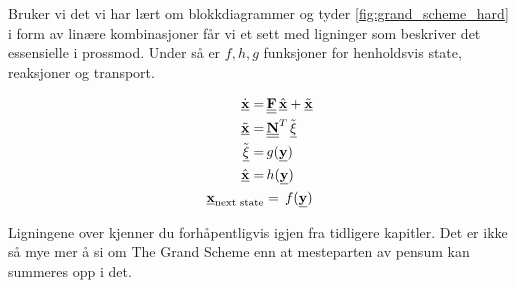 Bruker vi det vi har lært om blokkdiagrammer og tyder \cref{fig:grand_scheme_hard} i form av linære kombinasjoner får vi et sett med ligninger som beskriver det essensielle i prossmod. Under så er $f,h,g$ funksjoner for henholdsvis state, reaksjoner og transport. 

\begin{equation}
\label{eq:The_grand_scheme}
    \begin{split}
    \underline{\dot{\textbf{x}}} =&\, \underline{\underline{\textbf{F}}}\,\underline{\hat{\textbf{x}}} + \underline{\Tilde{\textbf{x}}} \\
    \underline{\Tilde{\textbf{x}}} =&\, \underline{\underline{\textbf{N}}}^T\,\Tilde{\underline{\xi}} \\
    \Tilde{\underline{\xi}} =&\, g(\underline{\textbf{y}}) \\
    \underline{\hat{\textbf{x}}} =&\, h(\underline{\textbf{y}}) \\
    \underline{\textbf{x}}_{\text{next state}} &=\, f(\underline{\textbf{y}}) 
    \end{split}
\end{equation}
    
Ligningene over kjenner du forhåpentligvis igjen fra tidligere kapitler. Det er ikke så mye mer å si om The Grand Scheme enn at mesteparten av pensum kan summeres opp i det. 
